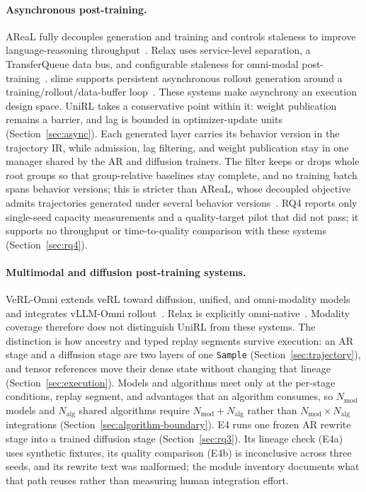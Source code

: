 \documentclass[10pt]{article}
\newcommand{\sample}{\texttt{Sample}}
\begin{document}
\paragraph{Asynchronous post-training.}
AReaL fully decouples generation and training and controls staleness to improve language-reasoning throughput~\citep{fu2025areal}.
Relax uses service-level separation, a TransferQueue data bus, and configurable staleness for omni-modal post-training~\citep{zhang2026relax}.
slime supports persistent asynchronous rollout generation around a training/rollout/data-buffer loop~\citep{slime2025}.
These systems make asynchrony an execution design space.
UniRL takes a conservative point within it: weight publication remains a barrier, and lag is bounded in optimizer-update units (Section~\ref{sec:async}).
Each generated layer carries its behavior version in the trajectory IR, while admission, lag filtering, and weight publication stay in one manager shared by the AR and diffusion trainers.
The filter keeps or drops whole root groups so that group-relative baselines stay complete, and no training batch spans behavior versions; this is stricter than AReaL, whose decoupled objective admits trajectories generated under several behavior versions~\citep{fu2025areal}.
RQ4 reports only single-seed capacity measurements and a quality-target pilot that did not pass; it supports no throughput or time-to-quality comparison with these systems (Section~\ref{sec:rq4}).

\paragraph{Multimodal and diffusion post-training systems.}
VeRL-Omni extends veRL toward diffusion, unified, and omni-modality models and integrates vLLM-Omni rollout~\citep{verlomni2026}.
Relax is explicitly omni-native~\citep{zhang2026relax}.
Modality coverage therefore does not distinguish UniRL from these systems.
The distinction is how ancestry and typed replay segments survive execution: an AR stage and a diffusion stage are two layers of one \sample{} (Section~\ref{sec:trajectory}), and tensor references move their dense state without changing that lineage (Section~\ref{sec:execution}).
Models and algorithms meet only at the per-stage conditions, replay segment, and advantages that an algorithm consumes, so $N_{\mathrm{mod}}$ models and $N_{\mathrm{alg}}$ shared algorithms require $N_{\mathrm{mod}}+N_{\mathrm{alg}}$ rather than $N_{\mathrm{mod}}\times N_{\mathrm{alg}}$ integrations (Section~\ref{sec:algorithm-boundary}).
E4 runs one frozen AR rewrite stage into a trained diffusion stage (Section~\ref{sec:rq3}).
Its lineage check (E4a) uses synthetic fixtures, its quality comparison (E4b) is inconclusive across three seeds, and its rewrite text was malformed; the module inventory documents what that path reuses rather than measuring human integration effort.
\end{document}
